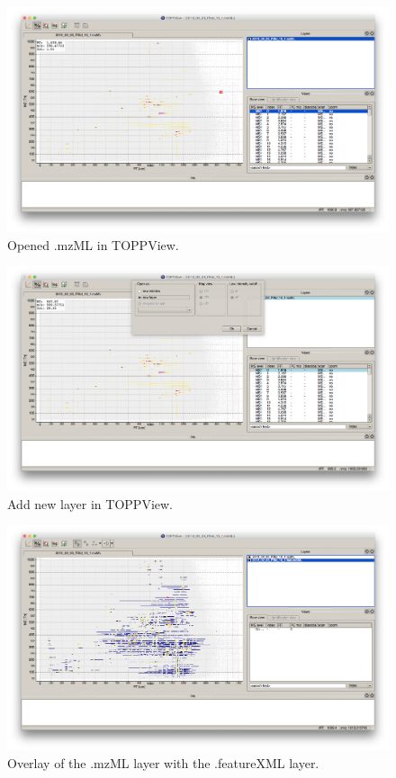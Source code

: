 \begin{figure}[htbp]
  \centering
  \includegraphics[width=\textwidth]{graphics/metabo/ToppView_1.png}
  \caption{Opened .mzML in TOPPView.}
  \label{fig:ToppView_1}
\end{figure}

\begin{figure}[htbp]
  \centering
  \includegraphics[width=\textwidth]{graphics/metabo/ToppView_2.png}
  \caption{Add new layer in TOPPView.}
  \label{fig:ToppView_2}
\end{figure}

\begin{figure}[htbp]
  \centering
  \includegraphics[width=\textwidth]{graphics/metabo/ToppView_3.png}
  \caption{Overlay of the .mzML layer with the .featureXML layer. }
  \label{fig:ToppView_3}
\end{figure}

